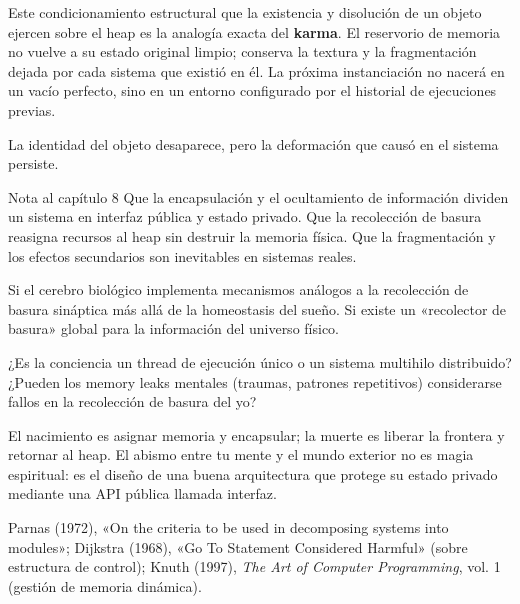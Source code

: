 Este condicionamiento estructural que la existencia y disolución de un objeto ejercen sobre el heap es la analogía exacta del \textbf{karma}. El reservorio de memoria no vuelve a su estado original limpio; conserva la textura y la fragmentación dejada por cada sistema que existió en él. La próxima instanciación no nacerá en un vacío perfecto, sino en un entorno configurado por el historial de ejecuciones previas.

La identidad del objeto desaparece, pero la deformación que causó en el sistema persiste.

\begin{notacap}{Nota al capítulo 8}
 Que la encapsulación y el ocultamiento de información dividen un sistema en interfaz pública y estado privado. Que la recolección de basura reasigna recursos al heap sin destruir la memoria física. Que la fragmentación y los efectos secundarios son inevitables en sistemas reales.

 Si el cerebro biológico implementa mecanismos análogos a la recolección de basura sináptica más allá de la homeostasis del sueño. Si existe un «recolector de basura» global para la información del universo físico.

 ¿Es la conciencia un thread de ejecución único o un sistema multihilo distribuido? ¿Pueden los memory leaks mentales (traumas, patrones repetitivos) considerarse fallos en la recolección de basura del yo?

 El nacimiento es asignar memoria y encapsular; la muerte es liberar la frontera y retornar al heap. El abismo entre tu mente y el mundo exterior no es magia espiritual: es el diseño de una buena arquitectura que protege su estado privado mediante una API pública llamada interfaz.

 Parnas (1972), «On the criteria to be used in decomposing systems into modules»; Dijkstra (1968), «Go To Statement Considered Harmful» (sobre estructura de control); Knuth (1997), \emph{The Art of Computer Programming}, vol. 1 (gestión de memoria dinámica).
\end{notacap}
\noindent {}

